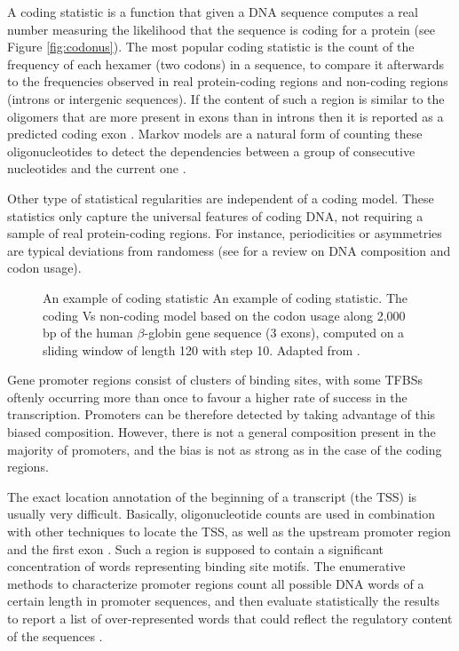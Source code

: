 A coding statistic 
is a function that given a DNA sequence computes a real number measuring the
likelihood that the sequence is coding for a protein (see Figure \ref{fig:codonus}). The most popular 
coding statistic is the count of the frequency of each hexamer (two codons) in a sequence, 
to compare it afterwards to the frequencies observed in real protein-coding regions and non-coding regions 
(introns or intergenic sequences). If the content of such a region is similar to the oligomers 
that are more present in exons than in introns then it is reported as a predicted coding exon 
\citep{stormo:2000a}. Markov models are a natural form of counting these oligonucleotides to 
detect the dependencies between a group of consecutive nucleotides and the current one 
\citep{haussler:1998a}.

Other type of statistical regularities are independent of a coding model. These statistics only
capture the universal features of coding DNA, not requiring a sample of real protein-coding regions.
For instance, periodicities or asymmetries are typical deviations from randomess (see 
\citet{guigo:1999a} for a review on DNA composition and codon usage).	


\begin{figure}[t!]
\begin{center}
\setlength{\fboxsep}{0pt}
          {An example of coding statistic}%
          {An example of coding statistic.}%
          {The coding Vs non-coding model based on the codon usage along 2,000 bp of the human 
$\beta$-globin gene sequence (3 exons), computed on a sliding window of length 120 with step 10.
           Adapted from \citet{guigo:1999a}.}
\end{center}
\end{figure}


Gene promoter regions consist of clusters of binding sites, with some TFBSs oftenly occurring more
than once to favour a higher rate of success in the transcription. Promoters can be therefore
detected by taking advantage of this biased composition. However, there is not a general composition
present in the majority of promoters, and the bias is not as strong as in the case of the coding 
regions.

The exact location annotation of the beginning of a transcript (the TSS) 
  is usually very 
difficult. Basically, oligonucleotide counts are used in combination with other techniques to locate 
the TSS, as well as the upstream promoter region and the first exon \citep{davuluri:2001a}. Such a 
region is supposed to 
contain a significant concentration of words representing binding site motifs. The enumerative 
methods to characterize promoter regions count all possible DNA words of a certain length in promoter 
sequences, and then evaluate statistically the results to report a list of over-represented words 
that could reflect the regulatory content of the sequences \citep{marino:2004a}.

